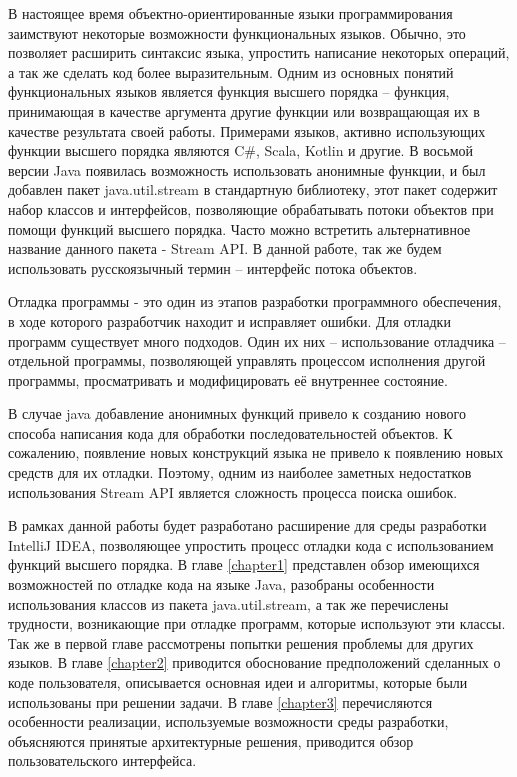 В настоящее время объектно-ориентированные языки программирования заимствуют некоторые возможности функциональных языков.  Обычно, это позволяет расширить синтаксис языка, упростить написание некоторых операций, а так же сделать код более выразительным. Одним из основных понятий функциональных языков является функция высшего порядка -- функция, принимающая в качестве аргумента другие функции или возвращающая их в качестве результата своей работы. Примерами языков, активно использующих функции высшего порядка являются C\#, Scala, Kotlin и другие. В восьмой версии Java появилась возможность использовать анонимные функции, и был добавлен пакет java.util.stream в стандартную библиотеку, этот пакет содержит набор классов и интерфейсов, позволяющие обрабатывать потоки объектов при помощи функций высшего порядка. Часто можно встретить альтернативное название данного пакета - Stream API. В данной работе, так же будем использовать русскоязычный термин -- интерфейс потока объектов.

Отладка программы - это один из этапов разработки программного обеспечения, в ходе которого разработчик находит и исправляет ошибки. Для отладки программ существует много подходов. Один их них -- использование отладчика -- отдельной программы, позволяющей управлять процессом исполнения другой программы, просматривать и модифицировать её внутреннее состояние.

В случае java добавление анонимных функций привело к созданию нового способа написания кода для обработки последовательностей объектов. К сожалению, появление новых конструкций языка не привело к появлению новых средств для их отладки. Поэтому, одним из наиболее заметных недостатков использования Stream API является сложность процесса поиска ошибок.

В рамках данной работы будет разработано расширение для среды разработки IntelliJ IDEA, позволяющее упростить процесс отладки кода с использованием функций высшего порядка. В главе \ref{chapter1} представлен обзор имеющихся возможностей по отладке кода на языке Java, разобраны особенности использования классов из пакета java.util.stream, а так же перечислены трудности, возникающие при отладке программ, которые используют эти классы. Так же в первой главе рассмотрены попытки решения проблемы для других языков. В главе \ref{chapter2} приводится обоснование предположений сделанных о коде пользователя, описывается основная идеи и алгоритмы, которые были использованы при решении задачи. В главе \ref{chapter3} перечисляются особенности реализации, используемые возможности среды разработки, объясняются принятые архитектурные решения, приводится обзор пользовательского интерфейса.

